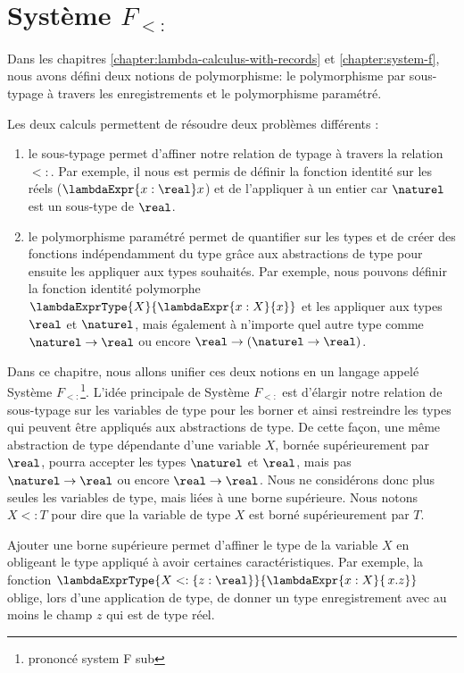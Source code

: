 \chapter{Système $F_{<:}$}
\label{chapter:system-f-sub}

Dans les chapitres \ref{chapter:lambda-calculus-with-records} et
\ref{chapter:system-f}, nous avons défini deux notions de polymorphisme: le
polymorphisme par sous-typage à travers les enregistrements et le polymorphisme
paramétré.

Les deux calculs permettent de résoudre deux problèmes différents :
\begin{enumerate}
  \item le sous-typage permet d'affiner notre relation de typage à travers la
    relation $<:$. Par exemple, il nous est permis de définir la fonction
    identité sur les réels ($\lambdaExpr{x : \real} x$) et de l'appliquer à un
    entier car $\naturel$ est un sous-type de $\real$.
  \item le polymorphisme paramétré permet de quantifier sur les types et de
    créer des fonctions indépendamment du type grâce aux abstractions de type
    pour ensuite les appliquer aux types souhaités. Par exemple, nous pouvons
    définir la fonction identité polymorphe $\lambdaExprType{X}{\lambdaExpr{x :
    X}{x}}$ et les appliquer aux types $\real$ et $\naturel$, mais également à
    n'importe quel autre type comme $\naturel \rightarrow \real$ ou encore $\real
    \rightarrow (\naturel \rightarrow \real)$.
\end{enumerate}

Dans ce chapitre, nous allons unifier ces deux notions en un langage appelé
Système $F_{<:}$\footnote{prononcé \og system F sub \fg}. L'idée principale de
Système $F_{<:}$ est d'élargir notre relation de sous-typage sur les variables de
type pour les borner et ainsi restreindre les types qui peuvent être appliqués
aux abstractions de type. De cette façon, une même abstraction de type dépendante d'une
variable $X$, bornée supérieurement par $\real$, pourra accepter les types $\naturel$ et
$\real$, mais pas $\naturel \rightarrow \real$ ou encore $\real \rightarrow
\real$. Nous ne considérons donc plus seules les variables de type, mais liées
à une borne supérieure. Nous notons $X <: T$ pour dire que la variable de type
$X$ est borné supérieurement par $T$.  

Ajouter une borne supérieure permet d'affiner le type de la variable $X$ en
obligeant le type appliqué à avoir certaines caractéristiques. Par exemple, la
fonction $\lambdaExprType{X <: \left\{ z : \real \right\}}{\lambdaExpr{x :
    X}{\, x.z}}$ oblige, lors d'une application de type, de donner un type
enregistrement avec au moins le champ $z$ qui est de type réel.

